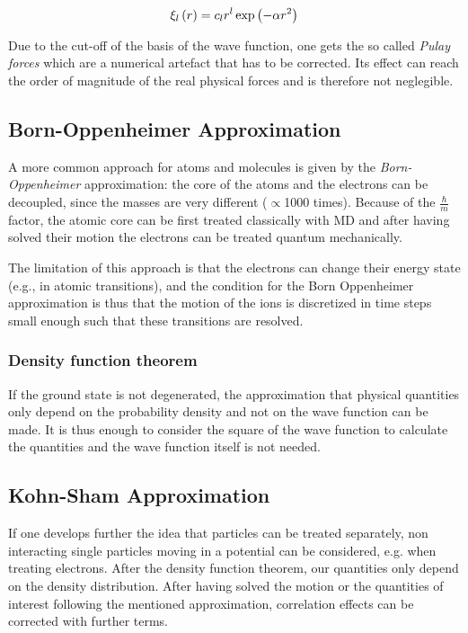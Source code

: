 \begin{equation}
\xi_l\left(r\right) = c_l r^l \exp\left(-\alpha r^2\right)
\end{equation}

Due to the cut-off of the basis of the  wave function, one gets the so called \emph{Pulay forces} which are a numerical artefact that has to be corrected. Its effect can reach the order of magnitude of the real physical forces and is therefore not neglegible.








\subsection{Born-Oppenheimer Approximation}

A more common approach for atoms and molecules is given by the \emph{Born-Oppenheimer} approximation: the core of the atoms and the electrons can be decoupled, since the masses are very different ($\propto$1000 times). Because of the $\frac{\hbar}{m}$ factor, the atomic core can be first treated classically with MD and after having solved their motion the electrons can be treated quantum mechanically.

The limitation  of this approach is that the electrons can change their energy state (e.g., in atomic transitions), and the condition for the Born Oppenheimer approximation is thus that the motion of the ions is discretized in time steps small enough such that these transitions are resolved.

\subsubsection*{Density function theorem}
If the ground state is not degenerated, the approximation that physical quantities only depend on the probability density and not on the wave function can be made. It is thus enough to consider the square of the wave function to calculate the quantities and the wave function itself is not needed.


\subsection{Kohn-Sham Approximation}
If one develops further the idea that particles can be treated separately, non interacting single particles moving in a potential can be considered, e.g. when treating electrons. After the density function theorem, our quantities only depend on the density distribution. After having solved the motion or the quantities of interest following the mentioned approximation, correlation effects can be corrected with further terms. 

